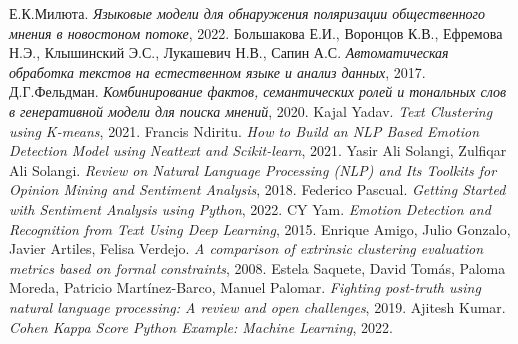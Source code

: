 \documentclass{article}
\begin{document}
\newpage
{}
 
\begin{thebibliography}{}
     Е.К.Милюта. \textit{Языковые модели для обнаружения поляризации общественного мнения в новостоном потоке}, 2022.
     Большакова Е.И., Воронцов К.В., Ефремова Н.Э., Клышинский Э.С., Лукашевич Н.В., Сапин А.С. \textit{Автоматическая обработка текстов на естественном языке и анализ данных}, 2017.
     Д.Г.Фельдман. \textit{Комбинирование фактов, семантических ролей и тональных слов в генеративной модели для поиска мнений}, 2020.
     Kajal Yadav. \textit{Text Clustering using K-means}, 2021.
     Francis Ndiritu. \textit{How to Build an NLP Based Emotion Detection Model using Neattext and Scikit-learn}, 2021.
     Yasir Ali Solangi, Zulfiqar Ali Solangi. \textit{Review on Natural Language Processing (NLP) and Its Toolkits for Opinion Mining and Sentiment Analysis}, 2018.
     Federico Pascual. \textit{Getting Started with Sentiment Analysis using Python}, 2022.
     CY Yam. \textit{Emotion Detection and Recognition from Text Using Deep Learning}, 2015.
     Enrique Amigo, Julio Gonzalo, Javier Artiles, Felisa Verdejo. \textit{A comparison of extrinsic clustering evaluation metrics based on formal constraints}, 2008.
     Estela Saquete, David Tomás, Paloma Moreda, Patricio Martínez-Barco, Manuel Palomar. \textit{Fighting post-truth using natural language processing: A review and open challenges}, 2019.
     Ajitesh Kumar. \textit{Cohen Kappa Score Python Example: Machine Learning}, 2022.
\end{thebibliography}

\def\BibUrl#1.{}\def\BibAnnote#1.{}


\end{document}
